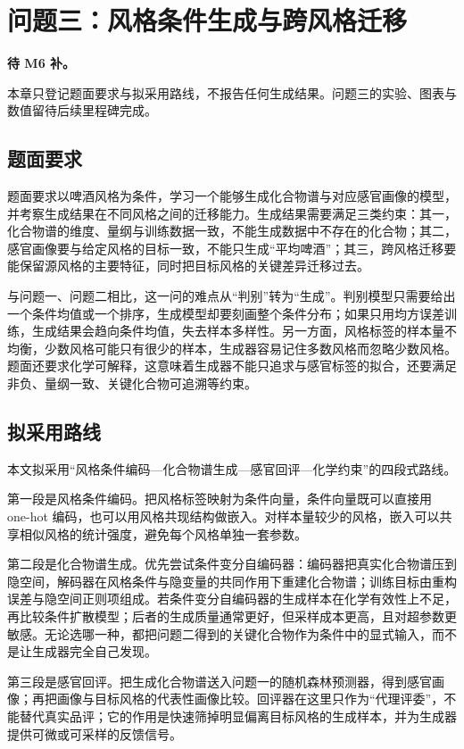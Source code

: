 \section{问题三：风格条件生成与跨风格迁移}

\noindent\textbf{待 M6 补。}

本章只登记题面要求与拟采用路线，不报告任何生成结果。问题三的实验、图表与数值留待后续里程碑完成。

\subsection{题面要求}

题面要求以啤酒风格为条件，学习一个能够生成化合物谱与对应感官画像的模型，并考察生成结果在不同风格之间的迁移能力。生成结果需要满足三类约束：其一，化合物谱的维度、量纲与训练数据一致，不能生成数据中不存在的化合物；其二，感官画像要与给定风格的目标一致，不能只生成“平均啤酒”；其三，跨风格迁移要能保留源风格的主要特征，同时把目标风格的关键差异迁移过去。

与问题一、问题二相比，这一问的难点从“判别”转为“生成”。判别模型只需要给出一个条件均值或一个排序，生成模型却要刻画整个条件分布；如果只用均方误差训练，生成结果会趋向条件均值，失去样本多样性。另一方面，风格标签的样本量不均衡，少数风格可能只有很少的样本，生成器容易记住多数风格而忽略少数风格。题面还要求化学可解释，这意味着生成器不能只追求与感官标签的拟合，还要满足非负、量纲一致、关键化合物可追溯等约束。

\subsection{拟采用路线}

本文拟采用“风格条件编码—化合物谱生成—感官回评—化学约束”的四段式路线。

第一段是风格条件编码。把风格标签映射为条件向量，条件向量既可以直接用 one-hot 编码，也可以用风格共现结构做嵌入。对样本量较少的风格，嵌入可以共享相似风格的统计强度，避免每个风格单独一套参数。

第二段是化合物谱生成。优先尝试条件变分自编码器：编码器把真实化合物谱压到隐空间，解码器在风格条件与隐变量的共同作用下重建化合物谱；训练目标由重构误差与隐空间正则项组成。若条件变分自编码器的生成样本在化学有效性上不足，再比较条件扩散模型；后者的生成质量通常更好，但采样成本更高，且对超参数更敏感。无论选哪一种，都把问题二得到的关键化合物作为条件中的显式输入，而不是让生成器完全自己发现。

第三段是感官回评。把生成化合物谱送入问题一的随机森林预测器，得到感官画像；再把画像与目标风格的代表性画像比较。回评器在这里只作为“代理评委”，不能替代真实品评；它的作用是快速筛掉明显偏离目标风格的生成样本，并为生成器提供可微或可采样的反馈信号。

